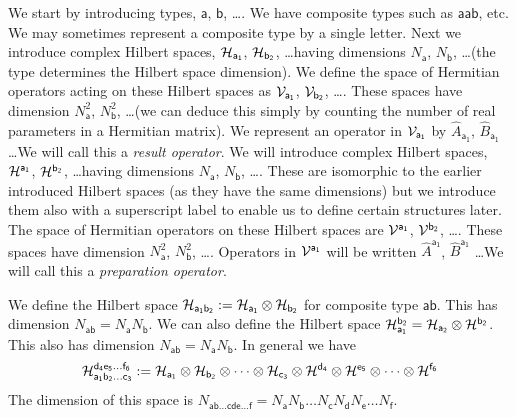\documentclass[10pt]{article}
\begin{document}
We start by introducing types, $\mathsf a$, $\mathsf b$, \dots.  We have composite types such as $\mathsf{aab}$, etc. We may sometimes represent a composite type by a single letter.  Next we introduce complex Hilbert spaces, ${\cal H}_\mathsf{a_1}$, ${\cal H}_\mathsf{b_2}$, \dots having dimensions $N_\mathsf{a}$, $N_\mathsf{b}$, \dots (the type determines the Hilbert space dimension).  We define the space of Hermitian operators acting on these Hilbert spaces as ${\cal V}_\mathsf{a_1}$, ${\cal V}_\mathsf{b_2}$, \dots.  These spaces have dimension $N_\mathsf{a}^2$, $N_\mathsf{b}^2$, \dots (we can deduce this simply by counting the number of real parameters in a Hermitian matrix).  We represent an operator in ${\cal V}_\mathsf{a_1}$ by $\hat A_\mathsf{a_1}$, $\hat B_\mathsf{a_1}$ \dots We will call this a {\it result operator}.  We will introduce complex Hilbert spaces, ${\cal H}^\mathsf{a_1}$, ${\cal H}^\mathsf{b_2}$, \dots having dimensions $N_\mathsf{a}$, $N_\mathsf{b}$, \dots. These are isomorphic to the earlier introduced Hilbert spaces (as they have the same dimensions) but we introduce them also with a superscript label to enable us to define certain structures later.  The space of Hermitian operators on these Hilbert spaces are ${\cal V}^\mathsf{a_1}$, ${\cal V}^\mathsf{b_2}$, \dots.  These spaces have dimension $N_\mathsf{a}^2$, $N_\mathsf{b}^2$, \dots.  Operators in ${\cal V}^\mathsf{a_1}$ will be written $\hat A^\mathsf{a_1}$, $\hat B^\mathsf{a_1}$ \dots We will call this a {\it preparation operator}.

We define the Hilbert space ${\cal H}_\mathsf{a_1b_2} := {\cal H}_\mathsf{a_1}\otimes{\cal H}_\mathsf{b_2}$ for composite type $\mathsf{ ab}$.  This has dimension $N_\mathsf{ab}=N_\mathsf{a}N_\mathsf{b}$.  We can also define the Hilbert space ${\cal H}_\mathsf{a_1}^\mathsf{b_2}= {\cal H}_\mathsf{a_2}\otimes{\cal H}^\mathsf{b_2}$. This also has dimension $N_\mathsf{ab}=N_\mathsf{a}N_\mathsf{b}$.  In general we have
\begin{equation}
{\cal H}_\mathsf{a_1b_2\dots c_3}^\mathsf{d_4e_5\dots f_6} := {\cal H}_\mathsf{a_1} \otimes {\cal H}_\mathsf{b_2} \otimes \dots \otimes {\cal H}_\mathsf{c_3}
\otimes {\cal H}^\mathsf{d_4} \otimes {\cal H}^\mathsf{e_5} \otimes \dots \otimes {\cal H}^\mathsf{f_6}
\end{equation}
The dimension of this space is $N_\mathsf{ab\dots cde\dots f}= N_\mathsf{a}N_\mathsf{b}\dots N_\mathsf{c}N_\mathsf{d}N_\mathsf{e}\dots N_\mathsf{f}$.
\end{document}

